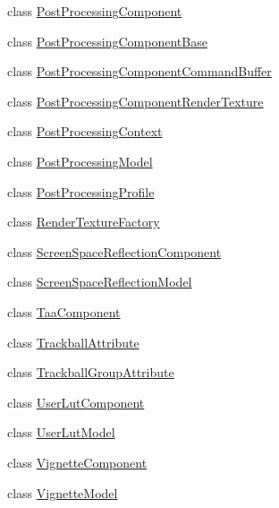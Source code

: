 \begin{DoxyCompactItemize}
\item 
class \mbox{\hyperlink{class_unity_engine_1_1_post_processing_1_1_post_processing_component}{Post\+Processing\+Component}}
\item 
class \mbox{\hyperlink{class_unity_engine_1_1_post_processing_1_1_post_processing_component_base}{Post\+Processing\+Component\+Base}}
\item 
class \mbox{\hyperlink{class_unity_engine_1_1_post_processing_1_1_post_processing_component_command_buffer}{Post\+Processing\+Component\+Command\+Buffer}}
\item 
class \mbox{\hyperlink{class_unity_engine_1_1_post_processing_1_1_post_processing_component_render_texture}{Post\+Processing\+Component\+Render\+Texture}}
\item 
class \mbox{\hyperlink{class_unity_engine_1_1_post_processing_1_1_post_processing_context}{Post\+Processing\+Context}}
\item 
class \mbox{\hyperlink{class_unity_engine_1_1_post_processing_1_1_post_processing_model}{Post\+Processing\+Model}}
\item 
class \mbox{\hyperlink{class_unity_engine_1_1_post_processing_1_1_post_processing_profile}{Post\+Processing\+Profile}}
\item 
class \mbox{\hyperlink{class_unity_engine_1_1_post_processing_1_1_render_texture_factory}{Render\+Texture\+Factory}}
\item 
class \mbox{\hyperlink{class_unity_engine_1_1_post_processing_1_1_screen_space_reflection_component}{Screen\+Space\+Reflection\+Component}}
\item 
class \mbox{\hyperlink{class_unity_engine_1_1_post_processing_1_1_screen_space_reflection_model}{Screen\+Space\+Reflection\+Model}}
\item 
class \mbox{\hyperlink{class_unity_engine_1_1_post_processing_1_1_taa_component}{Taa\+Component}}
\item 
class \mbox{\hyperlink{class_unity_engine_1_1_post_processing_1_1_trackball_attribute}{Trackball\+Attribute}}
\item 
class \mbox{\hyperlink{class_unity_engine_1_1_post_processing_1_1_trackball_group_attribute}{Trackball\+Group\+Attribute}}
\item 
class \mbox{\hyperlink{class_unity_engine_1_1_post_processing_1_1_user_lut_component}{User\+Lut\+Component}}
\item 
class \mbox{\hyperlink{class_unity_engine_1_1_post_processing_1_1_user_lut_model}{User\+Lut\+Model}}
\item 
class \mbox{\hyperlink{class_unity_engine_1_1_post_processing_1_1_vignette_component}{Vignette\+Component}}
\item 
class \mbox{\hyperlink{class_unity_engine_1_1_post_processing_1_1_vignette_model}{Vignette\+Model}}
\end{DoxyCompactItemize}
